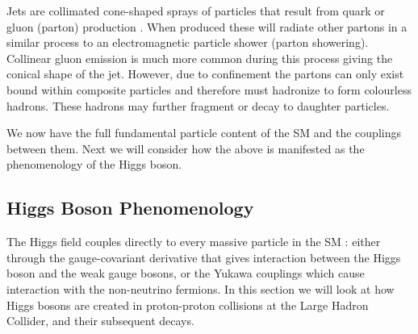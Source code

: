 Jets are collimated cone-shaped sprays of particles that result from quark or gluon (parton) production \cite{QCD_and_Jets}. 
When produced these will radiate other partons in a similar process to an electromagnetic particle shower (parton showering). 
Collinear gluon emission is much more common during this process giving the conical shape of the jet. 
However, due to confinement the partons can only exist bound within composite particles and therefore must hadronize to form colourless hadrons.
These hadrons may further fragment or decay to daughter particles. 


We now have the full fundamental particle content of the SM and the couplings between them. Next we will consider how the above is manifested as the phenomenology of the Higgs boson.


\subsection{Higgs Boson Phenomenology}
The Higgs field couples directly to every massive particle in the SM \cite{PDG}: either through the gauge-covariant derivative that gives interaction between the Higgs boson and the weak gauge bosons, or the Yukawa couplings which cause interaction with the non-neutrino fermions. In this section we will look at how Higgs bosons are created in proton-proton collisions at the Large Hadron Collider, and their subsequent decays.

